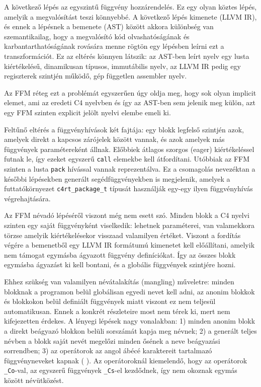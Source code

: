 A következő lépés az egyszintű függvény hozzárendelés.
Ez egy olyan köztes lépés, amelyik a megvalósítást teszi könnyebbé.
A következő lépés kimenete (LLVM \gls{IR}), és ennek a lépésnek a bemenete (\gls{AST}) között akkora különbség van szemantikailag, hogy a megvalósító kód olvashatóságának és karbantarthatóságának rovására menne rögtön egy lépésben leírni ezt a transzformációt.
Ez az eltérés könnyen látszik: az \gls{AST}-ben leírt nyelv egy lusta kiértékelésű, dinamikusan típusos, immutábilis nyelv,  az LLVM \gls{IR} pedig egy regiszterek szintjén működő, gép független assembler nyelv.

Az \gls{FFM} réteg ezt a problémát egyszerűen úgy oldja meg, hogy sok olyan implicit elemet, ami az eredeti C4 nyelvben és így az \gls{AST}-ben sem jelenik meg külön, azt egy \gls{FFM} szinten explicit jelölt nyelvi elembe emeli ki.

Feltűnő eltérés a függvényhívások két fajtája: egy blokk legfelső szintjén azok, amelyek direkt a kapcsos zárójelek között vannak, és azok amelyek más függvények paramétereként állnak. 
Előbbiek átlagos szorgos (eager) kiértékeléssel futnak le, így ezeket egyszerű {\tt call} elemekbe kell átfordítani.
Utóbbiak az \gls{FFM} szinten a lusta {\tt pack} hívással vannak reprezentálva.
Ez a csomagolás nevezéktan a későbbi lépésekben generált segédfüggvényekben is megjelenik, amelyek a futtatókörnyezet {\tt c4rt\_package\_t} típusát használják egy-egy ilyen függvényhívás végrehajtására.

Az \gls{FFM} névadó lépéséről viszont még nem esett szó.
Minden blokk a C4 nyelvi szinten egy saját függvényként viselkedik: lehetnek paraméterei, van valamekkora törzse amelyik kiértékelésekor visszaad valamilyen értéket.
Viszont a fordítás végére a bemenetből egy LLVM \gls{IR} formátumú kimenetet kell előállítani, amelyik nem támogat egymásba ágyazott függvény definíciókat.
Így az összes blokk egymásba ágyazást ki kell bontani, és a globális függvények szintjére hozni.

Ehhez szükség van valamilyen névátalakítás (mangling) műveletre:
minden blokknak a programon belül globálisan egyedi nevet kell adni, az anonim blokkok és blokkokon belül definiált függvények miatt viszont ez nem teljesül automatikusan.
Ennek a konkrét részleteire most nem térek ki, mert nem kifejezetten érdekes.
A lényegi lépések nagy vonalakban: 1) minden anonim blokk a direkt beágyazó blokkon belüli sorszámát kapja meg névnek; 2) a generált teljes névben a blokk saját nevét megelőzi minden ősének a neve beágyazási sorrendben; 3) az operátorok az angol ábécé karaktereit tartalmazó függvényneveket kapnak (\pl {\tt +} ).
Az operátoroknál kiemelendő, hogy az operátorok {\tt \_Co}-val, az egyszerű függvények {\tt \_Cs}-el kezdődnek, így nem okoznak egymás között névütközést.

